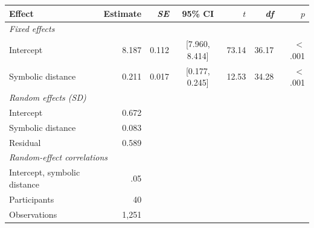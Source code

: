 \begin{tabular}{lrrcrrr}
\toprule
Effect & Estimate & \textit{SE} & 95\% CI & $t$ & \textit{df} & $p$ \\
\midrule
\multicolumn{7}{l}{\textit{Fixed effects}} \\
\quad Intercept & 8.187 & 0.112 & [7.960, 8.414] & 73.14 & 36.17 & $<$.001 \\
\quad Symbolic distance & 0.211 & 0.017 & [0.177, 0.245] & 12.53 & 34.28 & $<$.001 \\
\multicolumn{7}{l}{\textit{Random effects (SD)}} \\
\quad Intercept & 0.672 \\
\quad Symbolic distance & 0.083 \\
\quad Residual & 0.589 \\
\multicolumn{7}{l}{\textit{Random-effect correlations}} \\
\quad Intercept, symbolic distance & .05 \\
\midrule
Participants & 40 \\
Observations & 1,251 \\
\bottomrule
\end{tabular}
